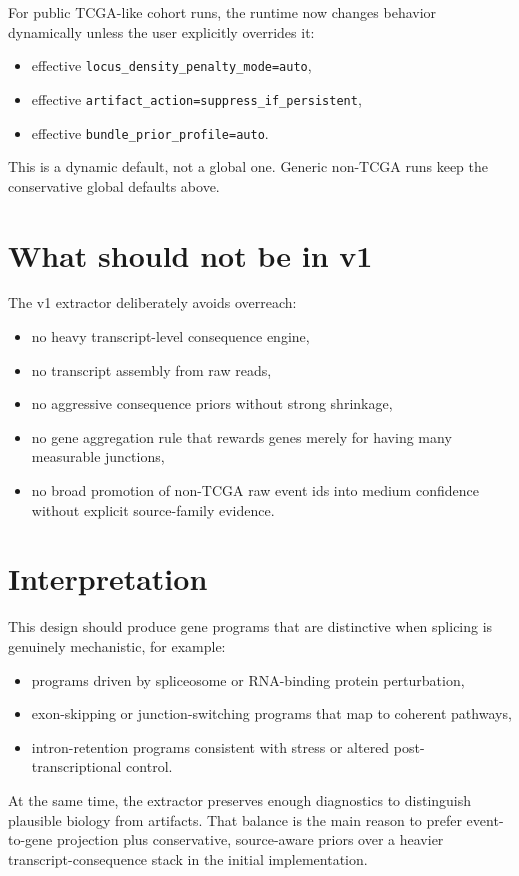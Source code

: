 \documentclass[11pt]{article}
\begin{document}
For public TCGA-like cohort runs, the runtime now changes behavior dynamically unless the user explicitly overrides it:
\begin{itemize}[leftmargin=2em]
\item effective \texttt{locus\_density\_penalty\_mode=auto},
\item effective \texttt{artifact\_action=suppress\_if\_persistent},
\item effective \texttt{bundle\_prior\_profile=auto}.
\end{itemize}

This is a dynamic default, not a global one. Generic non-TCGA runs keep the conservative global defaults above.

\section{What should not be in v1}
The v1 extractor deliberately avoids overreach:
\begin{itemize}[leftmargin=2em]
\item no heavy transcript-level consequence engine,
\item no transcript assembly from raw reads,
\item no aggressive consequence priors without strong shrinkage,
\item no gene aggregation rule that rewards genes merely for having many measurable junctions,
\item no broad promotion of non-TCGA raw event ids into medium confidence without explicit source-family evidence.
\end{itemize}

\section{Interpretation}
This design should produce gene programs that are distinctive when splicing is genuinely mechanistic, for example:
\begin{itemize}[leftmargin=2em]
\item programs driven by spliceosome or RNA-binding protein perturbation,
\item exon-skipping or junction-switching programs that map to coherent pathways,
\item intron-retention programs consistent with stress or altered post-transcriptional control.
\end{itemize}

At the same time, the extractor preserves enough diagnostics to distinguish plausible biology from artifacts. That balance is the main reason to prefer event-to-gene projection plus conservative, source-aware priors over a heavier transcript-consequence stack in the initial implementation.
\end{document}
